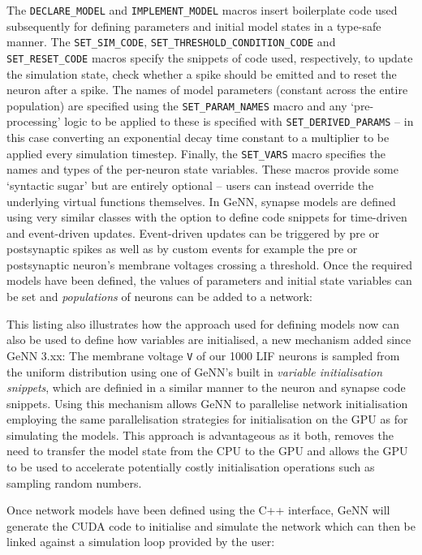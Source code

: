 \documentclass[utf8]{frontiersSCNS} %
\begin{document}
The \lstinline{DECLARE_MODEL} and \lstinline{IMPLEMENT_MODEL} macros insert boilerplate code used subsequently for defining parameters and initial model states in a type-safe manner.
The \lstinline{SET_SIM_CODE}, \lstinline{SET_THRESHOLD_CONDITION_CODE} and \lstinline{SET_RESET_CODE} macros specify the snippets of code used, respectively, to update the simulation state, check whether a spike should be emitted and to reset the neuron after a spike.
The names of model parameters (constant across the entire population) are specified using the \lstinline{SET_PARAM_NAMES} macro and any `pre-processing' logic to be applied to these is specified with \lstinline{SET_DERIVED_PARAMS} -- in this case converting an exponential decay time constant to a multiplier to be applied every simulation timestep.
Finally, the \lstinline{SET_VARS} macro specifies the names and types of the per-neuron state variables.
These macros provide some `syntactic sugar' but are entirely optional -- users can instead override the underlying virtual functions themselves.
In GeNN, synapse models are defined using very similar classes with the option to define code snippets for time-driven and event-driven updates.
Event-driven updates can be triggered by pre or postsynaptic spikes as well as by custom events for example the pre or postsynaptic neuron's membrane voltages crossing a threshold.
Once the required models have been defined, the values of parameters and initial state variables can be set and \textit{populations} of neurons can be added to a network:
%


This listing also illustrates how the approach used for defining models now can also be used to define how variables are initialised, a new mechanism added since GeNN 3.xx:
The membrane voltage \lstinline{V} of our \num{1000} LIF neurons is sampled from the uniform distribution using one of GeNN's built in \textit{variable initialisation snippets}, which are definied in a similar manner to the neuron and synapse code snippets. Using this mechanism allows GeNN to parallelise network initialisation employing the same parallelisation strategies for initialisation on the GPU as for simulating the models.
This approach is advantageous as it both, removes the need to transfer the model state from the CPU to the GPU and allows the GPU to be used to accelerate potentially costly initialisation operations such as sampling random numbers.

Once network models have been defined using the C++ interface, GeNN will generate the CUDA code to initialise and simulate the network which can then be linked against a simulation loop provided by the user:
\end{document}
